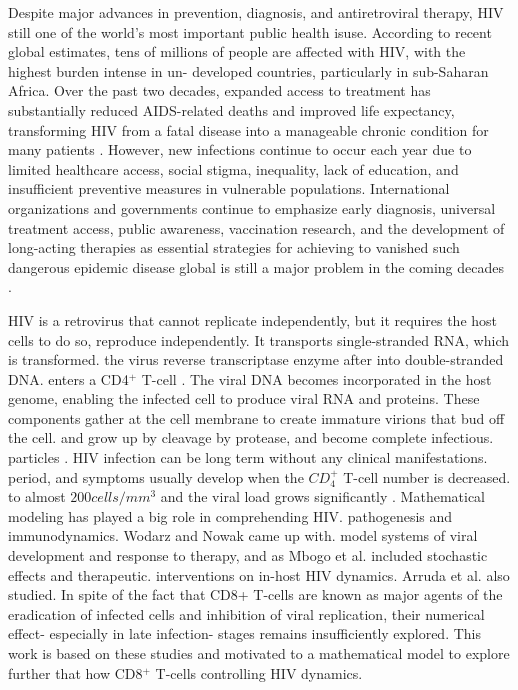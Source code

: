 \documentclass{article}
\theoremstyle{plain}
\theoremstyle{definition}
\numberwithin{equation}{section}
\begin{document}
Despite major advances in prevention, diagnosis, and antiretroviral therapy, HIV still one of the world’s most important public health isuse. According to recent global estimates, tens of millions of people are affected with HIV, with the highest burden intense in un- developed countries, particularly in sub-Saharan Africa. Over the past two decades, expanded access to treatment has substantially reduced AIDS-related deaths and improved life expectancy, transforming HIV from a fatal disease into a manageable chronic condition for many patients \cite{s1}. However, new infections continue to occur each year due to limited healthcare access, social stigma, inequality, lack of education, and insufficient preventive measures in vulnerable populations. International organizations and governments continue to emphasize early diagnosis, universal treatment access, public awareness, vaccination research, and the development of long-acting therapies as essential strategies for achieving to vanished such dangerous epidemic disease global is still a major problem in the coming decades \cite{s2}.




HIV is a retrovirus that cannot replicate independently, but it requires the host cells to do so,
reproduce independently. It transports single-stranded RNA, which is transformed.
the virus reverse transcriptase enzyme after into double-stranded DNA.
enters a CD4$^{+}$ T-cell \cite{h1}. The viral DNA becomes incorporated in the host genome,
enabling the infected cell to produce viral RNA and proteins. These components
gather at the cell membrane to create immature virions that bud off the cell.
and grow up by cleavage by protease, and become complete infectious.
particles \cite{h3}. HIV infection can be long term without any clinical manifestations.
period, and symptoms usually develop when the $CD_4^{+}$ T-cell number is decreased.
to almost $200 cells/mm^{3}$ and the viral load grows significantly \cite{h2}. Mathematical modeling has played a big role in comprehending HIV.
pathogenesis and immunodynamics. Wodarz and Nowak \cite{h2} came up with.
model systems of viral development and response to therapy,
and as Mbogo et al. \cite{h1} included stochastic effects and therapeutic.
interventions on in-host HIV dynamics. Arruda et al. \cite{h4} also studied.
In spite of the fact that CD8+ T-cells are known as major agents of the eradication of infected cells and inhibition of viral replication, their numerical effect- especially in late infection- stages remains insufficiently explored. This work is based on these studies and motivated to a mathematical model to explore further that how 
CD8$^{+}$ T-cells controlling HIV dynamics.
\end{document}
